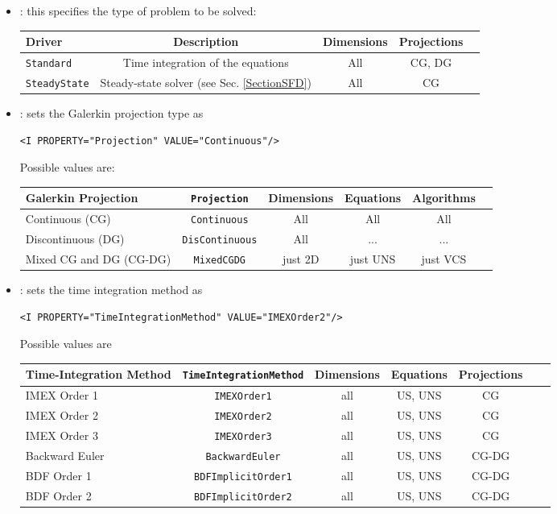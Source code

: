 \begin{itemize}
\item {}: this specifies the type of problem to be solved:
\begin{center}
\footnotesize
\begin{tabular}{lcccc}
\toprule
{Driver} & {Description} &{Dimensions}&{Projections} \\
\midrule
\texttt{Standard} & Time integration of the equations & All & CG, DG \\
\texttt{SteadyState} & Steady-state solver (see Sec. \ref{SectionSFD})  & All & CG \\
\bottomrule
\end{tabular}
\end{center}

\item {}: sets the Galerkin projection type as
\begin{lstlisting}[style=XMLStyle]
<I PROPERTY="Projection" VALUE="Continuous"/>
\end{lstlisting}

Possible values are:
\begin{center}
\footnotesize
\begin{tabular}{lccccc}
\toprule
{Galerkin Projection} & \texttt{Projection} &{Dimensions}&{Equations}&{Algorithms} \\
\midrule
Continuous (CG)&  \texttt{Continuous} & All & All & All \\
Discontinuous (DG) & \texttt{DisContinuous} & All &...&...\\
Mixed CG and DG (CG-DG) & \texttt{MixedCGDG} & just 2D & just UNS & just VCS \\
\bottomrule
\end{tabular}
\end{center}

\item {}:  sets the time integration method as
\begin{lstlisting}[style=XMLStyle]
<I PROPERTY="TimeIntegrationMethod" VALUE="IMEXOrder2"/>
\end{lstlisting}

Possible values are
\begin{center}
\footnotesize
\begin{tabular}{lcccccc}
\toprule
{Time-Integration Method} & \texttt{TimeIntegrationMethod} &{Dimensions}&{Equations}&Projections\\
\midrule
IMEX Order 1 & \texttt{IMEXOrder1} & all & US, UNS &  CG \\
IMEX Order 2 & \texttt{IMEXOrder2} & all & US, UNS &  CG \\
IMEX Order 3 & \texttt{IMEXOrder3} & all & US, UNS & CG \\
Backward Euler & \texttt{BackwardEuler} & all & US, UNS &  CG-DG \\
BDF Order 1 & \texttt{BDFImplicitOrder1} & all & US, UNS & CG-DG \\
BDF Order 2 & \texttt{BDFImplicitOrder2} & all & US, UNS & CG-DG \\
\bottomrule
\end{tabular}
\end{center}


\end{itemize}
